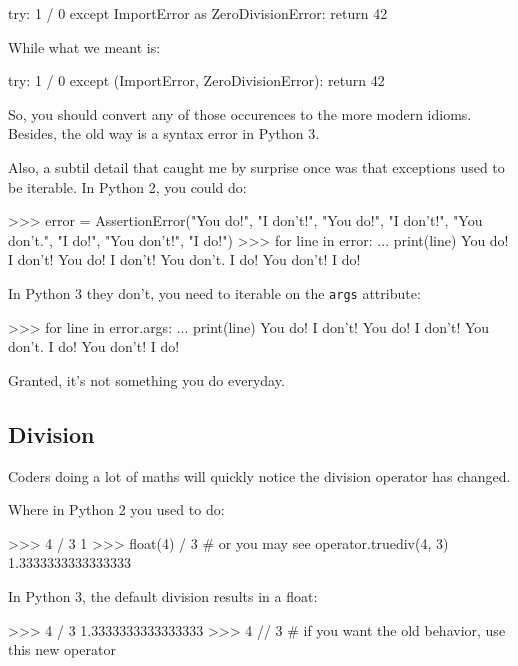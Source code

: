 \begin{py2}
try:
    1 / 0
except ImportError as ZeroDivisionError:
    return 42
\end{py2}

While what we meant is:

\begin{py2}
try:
    1 / 0
except (ImportError, ZeroDivisionError):
    return 42
\end{py2}

So, you should convert any of those occurences to the more modern idioms. Besides, the old way is a syntax error in Python 3.

Also, a subtil detail that caught me by surprise once was that exceptions used to be \gls{iterable}. In Python 2, you could do:

\begin{py2}
>>> error = AssertionError("You do!", "I don't!", "You do!", "I don't!", "You don't.", "I do!",  "You don't!", "I do!")
>>> for line in error:
...     print(line)
You do!
I don't!
You do!
I don't!
You don't.
I do!
You don't!
I do!
\begin{py2}

In Python 3 they don't, you need to iterable on the \lstinline{args} attribute:

\begin{py2and3}
>>> for line in error.args:
...     print(line)
You do!
I don't!
You do!
I don't!
You don't.
I do!
You don't!
I do!
\begin{py2and3}

Granted, it's not something you do everyday.

\subsection{Division}

Coders doing a lot of maths will quickly notice the division operator has changed.

Where in Python 2 you used to do:

\begin{py2}
>>> 4 / 3
1
>>> float(4) / 3  # or you may see operator.truediv(4, 3)
1.3333333333333333
\end{py2}

In Python 3, the default division results in a float:

\begin{py3}
>>> 4 / 3
1.3333333333333333
>>> 4 // 3  # if you want the old behavior, use this new operator
\end{py3}


\end{py2and3}
\end{py2and3}
\end{py2}
\end{py2}
